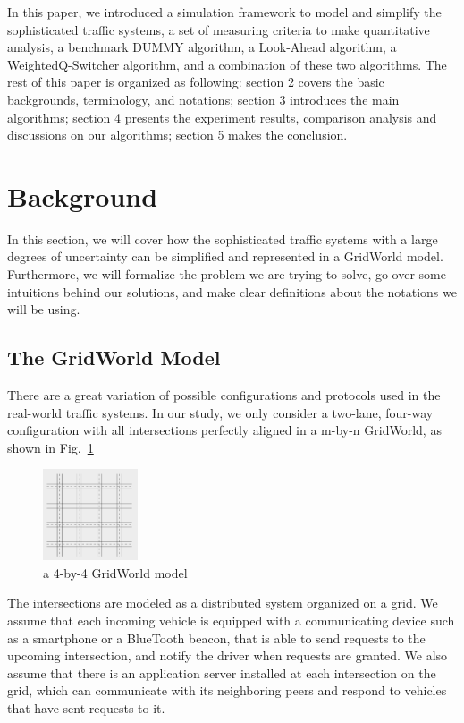 \documentclass[conference]{IEEEtran}
\begin{document}
In this paper, we introduced a simulation framework to model and simplify the sophisticated traffic systems, a set of measuring criteria to make quantitative analysis, a benchmark DUMMY algorithm, a Look-Ahead algorithm, a WeightedQ-Switcher algorithm, and a combination of these two algorithms. The rest of this paper is organized as following: section 2 covers the basic backgrounds, terminology, and notations; section 3 introduces the main algorithms; section 4 presents the experiment results, comparison analysis and discussions on our algorithms; section 5 makes the conclusion.


\section{Background}
In this section, we will cover how the sophisticated traffic systems with a large degrees of uncertainty can be simplified and represented in a GridWorld model. Furthermore, we will formalize the problem we are trying to solve, go over some intuitions behind our solutions, and make clear definitions about the notations we will be using.

\subsection{The GridWorld Model}
There are a great variation of possible configurations and protocols used in the real-world traffic systems. In our study, we only consider a two-lane, four-way configuration with all intersections perfectly aligned in a m-by-n GridWorld, as shown in Fig.~\ref{gridworld_barebone}

\begin{figure}[h]
    \center    
    \includegraphics[width=0.25\textwidth]{images/gridworld_barebone.png}
	\caption{a 4-by-4 GridWorld model}
	\label{gridworld_barebone}
\end{figure}


The intersections are modeled as a distributed system organized on a grid. We assume that each incoming vehicle is equipped with a communicating device such as a smartphone or a BlueTooth beacon, that is able to send requests to the upcoming intersection, and notify the driver when requests are granted. We also assume that there is an application server installed at each intersection on the grid, which can communicate with its neighboring peers and respond to vehicles that have sent requests to it.
\end{document}
